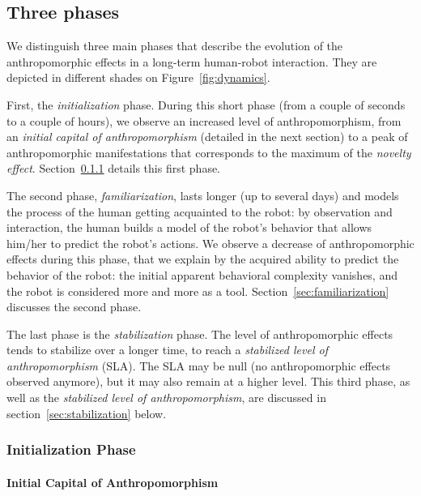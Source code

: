 \documentclass{frontiersSCNS} %
\begin{document}
\subsection{Three phases}
\label{sec:phases}

We distinguish three main phases that describe the evolution of the
anthropomorphic effects in a long-term human-robot interaction. They are
depicted in different shades on Figure~\ref{fig:dynamics}.

First, the \emph{initialization} phase. During this short phase (from a couple
of seconds to a couple of hours), we observe an increased level of
anthropomorphism, from an \emph{initial capital of anthropomorphism}
(detailed in the next section) to a peak of anthropomorphic manifestations
that corresponds to the maximum of the \emph{novelty effect}.
Section~\ref{sec:initialization} details this first phase.

The second phase, \emph{familiarization}, lasts longer (up to several days) and
models the process of the human getting acquainted to the robot: by observation
and interaction, the human builds a model of the robot's behavior that allows
him/her to predict the robot's actions. We observe a decrease of
anthropomorphic effects during this phase, that we explain by the acquired
ability to predict the behavior of the robot: the initial apparent behavioral
complexity vanishes, and the robot is considered more and more as a tool.
Section~\ref{sec:familiarization} discusses the second phase.

The last phase is the \emph{stabilization} phase. The level of anthropomorphic
effects tends to stabilize over a longer time, to reach a \emph{stabilized
level of anthropomorphism} (SLA). The SLA may be null (no anthropomorphic
effects observed anymore), but it may also remain at a higher level.  This
third phase, as well as the \emph{stabilized level of anthropomorphism}, are
discussed in section~\ref{sec:stabilization} below.

\subsubsection{Initialization Phase}
\label{sec:initialization}

\paragraph{Initial Capital of Anthropomorphism}
\label{sec:ica}
\end{document}

